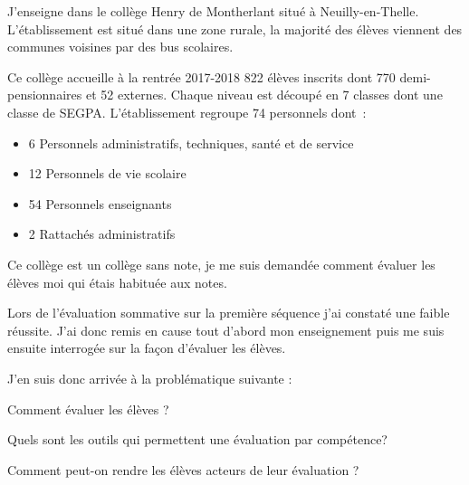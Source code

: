 

J'enseigne dans le collège Henry de Montherlant situé à Neuilly-en-Thelle.
L'établissement est situé dans une zone rurale, la majorité des élèves viennent des communes voisines par des bus scolaires.

Ce collège accueille à la rentrée 2017-2018 822 élèves inscrits dont 770 demi-pensionnaires et 52 externes.
Chaque niveau est découpé en 7 classes dont une classe de SEGPA.
L'établissement regroupe 74 personnels dont~:
\begin{itemize}
\item 6 Personnels administratifs, techniques, santé et de service
\item 12 Personnels de vie scolaire
\item 54 Personnels enseignants
\item 2 Rattachés administratifs
\end{itemize}

Ce collège est un collège sans note, je me suis demandée comment évaluer les élèves moi qui étais habituée aux notes.

Lors de l'évaluation sommative sur la première séquence j'ai constaté une faible réussite.
J'ai donc remis en cause tout d'abord mon enseignement puis me suis ensuite interrogée sur la façon d'évaluer les élèves.

J'en suis donc arrivée à la problématique suivante : 

Comment évaluer les élèves ?

Quels sont les outils qui permettent une évaluation par compétence?

Comment peut-on rendre les élèves acteurs de leur évaluation ?

